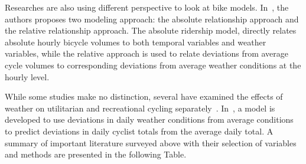 \documentclass [11pt, proquest] {uwthesis}[2015/03/03]
\begin{document}
Researches are also using different perspective to look at bike models. In~\cite{Miranda-Moreno:2011aa}, the authors proposes two modeling approach: the absolute relationship approach and the relative relationship approach. The absolute ridership model, directly relates absolute hourly bicycle volumes to both temporal variables and weather variables, while the relative approach is used to relate deviations from average cycle volumes to corresponding deviations from average weather conditions at the hourly level. 

While some studies make no distinction, several have examined the effects of weather on utilitarian and recreational cycling separately~\cite{Brandenburg07, Hanson77, Thomas12}. In~\cite{Nosal:2014aa}, a model is developed to use deviations in daily weather conditions from average conditions to predict deviations in daily cyclist totals from the average daily total. 
A summary of important literature surveyed above with their selection of variables and methods are presented in the following Table. %
\end{document}
